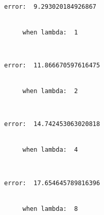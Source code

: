 \documentclass[11pt]{article}
\begin{document}
    \begin{Verbatim}[commandchars=\\\{\}]
     error:  9.293020184926867


     when lambda:  1

    \end{Verbatim}

    \begin{center}
    \end{center}
    { \hspace*{\fill} \\}
    
    \begin{Verbatim}[commandchars=\\\{\}]
     error:  11.866670597616475


     when lambda:  2

    \end{Verbatim}

    \begin{center}
    \end{center}
    { \hspace*{\fill} \\}
    
    \begin{Verbatim}[commandchars=\\\{\}]
     error:  14.742453063020818


     when lambda:  4

    \end{Verbatim}

    \begin{center}
    \end{center}
    { \hspace*{\fill} \\}
    
    \begin{Verbatim}[commandchars=\\\{\}]
     error:  17.654645789816396


     when lambda:  8

    \end{Verbatim}

    \begin{center}
    \end{center}
    { \hspace*{\fill} \\}
    
\end{document}
